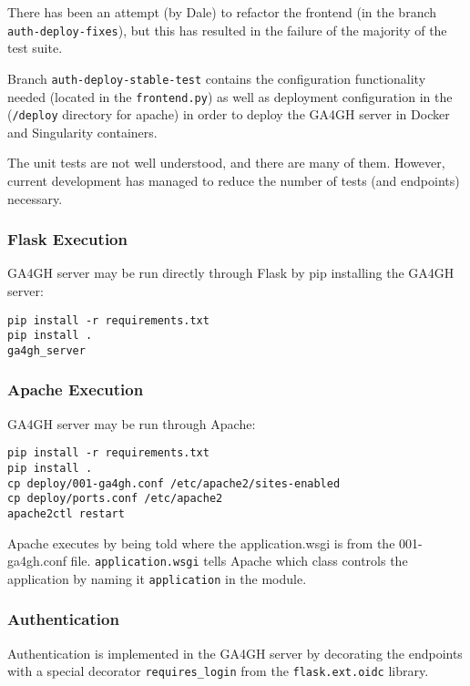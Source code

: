 \documentclass{article}
\begin{document}
There has been an attempt (by Dale) to refactor the frontend
(in the branch \texttt{auth-deploy-fixes}), but this has resulted in the 
failure of the majority of the test suite. 

Branch \texttt{auth-deploy-stable-test} contains the configuration functionality
needed (located in the \texttt{frontend.py}) as well as deployment configuration
in the (\texttt{/deploy} directory for apache) in order to deploy the GA4GH
server in Docker and Singularity containers.

The unit tests are not well understood, and there are many of them.
However, current development has managed to reduce the number of 
tests (and endpoints) necessary.

\subsubsection{Flask Execution}

GA4GH server may be run directly through Flask by pip installing the GA4GH server:

\begin{verbatim}
pip install -r requirements.txt
pip install .
ga4gh_server
\end{verbatim}

\subsubsection{Apache Execution}

GA4GH server may be run through Apache:

\begin{verbatim}
pip install -r requirements.txt
pip install .
cp deploy/001-ga4gh.conf /etc/apache2/sites-enabled
cp deploy/ports.conf /etc/apache2
apache2ctl restart
\end{verbatim}

Apache executes by being told where the application.wsgi is 
from the 001-ga4gh.conf file. \texttt{application.wsgi} tells
Apache which class controls the application by naming
it \texttt{application} in the module.

\subsubsection{Authentication}

Authentication is implemented in the GA4GH server by decorating the
endpoints with a special decorator \texttt{requires\_login} from the \texttt{flask.ext.oidc} library.
\end{document}
